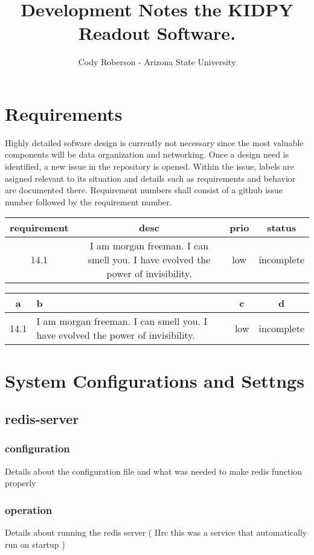 \documentclass[11pt,letterpaper]{article}
\begin{document}
\title{Development Notes the KIDPY Readout Software.}
\author{Cody Roberson - Arizona State University}
\maketitle
\newpage
\tableofcontents
\newpage
\noindent
\section{Requirements}
Highly detailed sofware design is currently not necessary since the most valuable components will be data organization and networking.
Once a design need is identified, a new issue in the repository is opened. Within the issue, labels are asigned relevant to its situation and details
such as requirements and behavior are documented there. Requirement numbers shall consist of a github issue number followed by the requirement number. 
\newpage
\begin{center}
\begin{tabular}{|c|c|c|c|}
	\hline
	requirement & desc & prio & status \\
	\hline
	14.1 & I am morgan freeman. I can smell you. I have evolved the power of invisibility.  & low & incomplete \\
	\hline
\end{tabular}

\begin{tabular}{|c|>{\centering\arraybackslash}m{3cm}|c|c|}
	\hline
	a & b & c & d \\
	\hline
	14.1 & I am morgan freeman. I can smell you. I have evolved the power of invisibility.  & low & incomplete  \\
	\hline
\end{tabular}
\end{center}


\section{System Configurations and Settngs}
\subsection{redis-server}
\subsubsection{configuration}
Details about the configuration file and what was needed to make redis function properly
\subsubsection{operation}
Details about running the redis server ( IIrc this was a service that automatically run on startup )
\end{document}
